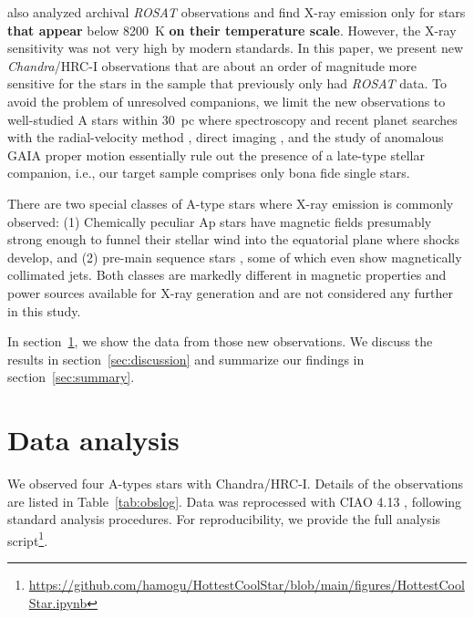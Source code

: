\documentclass[linenumbers]{aastex631}
\begin{document}
\citet{2002ApJ...579..800S} also analyzed archival \emph{ROSAT} observations
and find X-ray emission only for stars \textbf{that appear} below 8200~K \textbf{on their temperature scale}. However, the X-ray sensitivity was not very high by modern standards. 
In this paper, we present new \emph{Chandra}/HRC-I observations that are about an order of magnitude more sensitive for the stars in the \citet{2002ApJ...579..800S} sample that previously only had \emph{ROSAT} data. 
To avoid the problem of unresolved companions, we limit the new observations to well-studied A stars within 30~pc
where spectroscopy and recent planet searches with the radial-velocity method \citep[e.g.][]{2021AJ....161..157H}, direct imaging \citep[e.g.][]{2013ApJ...776....4N,2017AJ....154..245M}, and the study of anomalous GAIA proper motion \citep{2019A&A...623A..72K} essentially rule out the presence of a late-type stellar companion, i.e., our target sample comprises only bona fide single stars.

There are two special classes of A-type stars where X-ray emission is commonly observed: (1) Chemically peculiar Ap \citep{1997A&A...323..121B,2011A&A...531A..58R} stars have magnetic fields presumably strong enough to funnel their stellar wind into the equatorial plane where shocks develop, and (2) pre-main sequence stars \citep[Herbig Ae stars, e.g.][]{2004ApJ...614..221S,2020ApJ...888...15S,2007A&A...468..541T,2009A&A...494.1041G}, some of which even show magnetically collimated jets. Both classes are markedly different in magnetic properties and power sources available for X-ray generation and are not considered any further in this study.

In section~\ref{sec:data}, we show the data from those new observations. We discuss the results in section~\ref{sec:discussion} and summarize our findings in section~\ref{sec:summary}.


\section{Data analysis} \label{sec:data}
We observed four A-types stars with Chandra/HRC-I. Details of the observations are listed in Table~\ref{tab:obslog}. Data was reprocessed with CIAO 4.13 \citep{2006SPIE.6270E..1VF}, following standard analysis procedures.
For reproducibility, we provide the full analysis script\footnote{\url{https://github.com/hamogu/HottestCoolStar/blob/main/figures/HottestCoolStar.ipynb}}.
\end{document}
